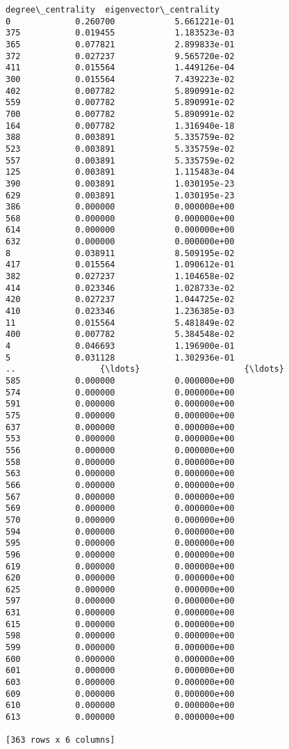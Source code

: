 \documentclass[11pt]{article}
\begin{document}
\begin{Verbatim}[commandchars=\\\{\}]
     degree\_centrality  eigenvector\_centrality  
0             0.260700            5.661221e-01  
375           0.019455            1.183523e-03  
365           0.077821            2.899833e-01  
372           0.027237            9.565720e-02  
411           0.015564            1.449126e-04  
300           0.015564            7.439223e-02  
402           0.007782            5.890991e-02  
559           0.007782            5.890991e-02  
700           0.007782            5.890991e-02  
164           0.007782            1.316940e-18  
388           0.003891            5.335759e-02  
523           0.003891            5.335759e-02  
557           0.003891            5.335759e-02  
125           0.003891            1.115483e-04  
390           0.003891            1.030195e-23  
629           0.003891            1.030195e-23  
386           0.000000            0.000000e+00  
568           0.000000            0.000000e+00  
614           0.000000            0.000000e+00  
632           0.000000            0.000000e+00  
8             0.038911            8.509195e-02  
417           0.015564            1.090612e-01  
382           0.027237            1.104658e-02  
414           0.023346            1.028733e-02  
420           0.027237            1.044725e-02  
410           0.023346            1.236385e-03  
11            0.015564            5.481849e-02  
400           0.007782            5.384548e-02  
4             0.046693            1.196900e-01  
5             0.031128            1.302936e-01  
..                 {\ldots}                     {\ldots}  
585           0.000000            0.000000e+00  
574           0.000000            0.000000e+00  
591           0.000000            0.000000e+00  
575           0.000000            0.000000e+00  
637           0.000000            0.000000e+00  
553           0.000000            0.000000e+00  
556           0.000000            0.000000e+00  
558           0.000000            0.000000e+00  
563           0.000000            0.000000e+00  
566           0.000000            0.000000e+00  
567           0.000000            0.000000e+00  
569           0.000000            0.000000e+00  
570           0.000000            0.000000e+00  
594           0.000000            0.000000e+00  
595           0.000000            0.000000e+00  
596           0.000000            0.000000e+00  
619           0.000000            0.000000e+00  
620           0.000000            0.000000e+00  
625           0.000000            0.000000e+00  
597           0.000000            0.000000e+00  
631           0.000000            0.000000e+00  
615           0.000000            0.000000e+00  
598           0.000000            0.000000e+00  
599           0.000000            0.000000e+00  
600           0.000000            0.000000e+00  
601           0.000000            0.000000e+00  
603           0.000000            0.000000e+00  
609           0.000000            0.000000e+00  
610           0.000000            0.000000e+00  
613           0.000000            0.000000e+00  

[363 rows x 6 columns]

    \end{Verbatim}
\end{document}
